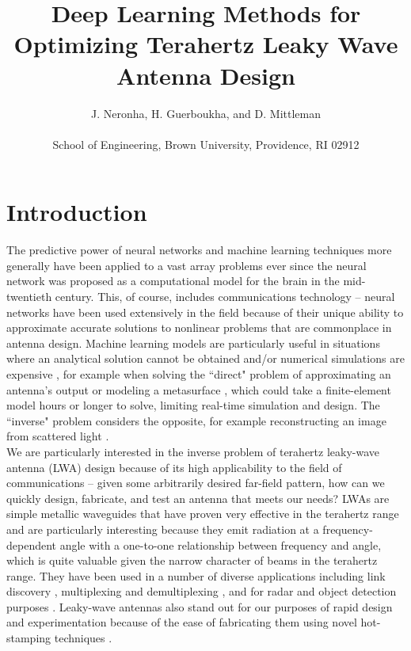 \documentclass[11pt]{article}
\begin{document}
\title{Deep Learning Methods for Optimizing Terahertz Leaky Wave Antenna Design}
\author{J. Neronha, H. Guerboukha, and D. Mittleman \\ \\ \small School of Engineering, Brown University, Providence, RI 02912}
\date{}

\maketitle

\section*{Introduction}

The predictive power of neural networks and machine learning techniques more generally have been applied to a vast array problems ever since the neural network was proposed as a computational model for the brain in the mid-twentieth century. \cite{McCulloch:1943vq} This, of course, includes communications technology -- neural networks have been used extensively in the field because of their unique ability to approximate accurate solutions to nonlinear problems that are commonplace in antenna design. Machine learning models are particularly useful in situations where an analytical solution cannot be obtained and/or numerical simulations are expensive \cite{Kim, Massa}, for example when solving the ``direct" problem of approximating an antenna's output \cite{8608745} or modeling a metasurface \cite{Nadell:19}, which could take a finite-element model hours or longer to solve, limiting real-time simulation and design. The ``inverse" problem considers the opposite, for example reconstructing an image from scattered light \cite{Sun:18}. \\

\noindent We are particularly interested in the inverse problem of terahertz leaky-wave antenna (LWA) design because of its high applicability to the field of communications -- given some arbitrarily desired far-field pattern, how can we quickly design, fabricate, and test an antenna that meets our needs? LWAs are simple metallic waveguides that have proven very effective in the terahertz range and are particularly interesting because they emit radiation at a frequency-dependent angle with a one-to-one relationship between frequency and angle, which is quite valuable given the narrow character of beams in the terahertz range. \cite{doi:10.1063/5.0033126} They have been used in a number of diverse applications including link discovery \cite{Ghasempour:2020tz}, multiplexing and demultiplexing \cite{Karl:2015uh, Ma:2017vo}, and for radar and object detection purposes \cite{Amarasinghe:20}. Leaky-wave antennas also stand out for our purposes of rapid design and experimentation because of the ease of fabricating them using novel hot-stamping techniques \cite{Guerboukha:21}. \\
\end{document}
